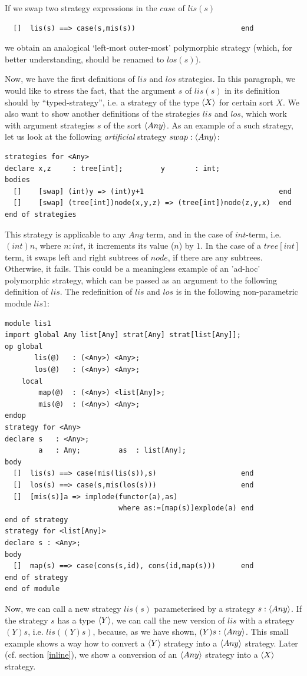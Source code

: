 \documentclass{article}
\begin{document}
{If we swap two strategy expressions in the $case$ of $lis(s)$
%
{\small
\begin{verbatim}
  []  lis(s) ==> case(s,mis(s))                         end
\end{verbatim}}\noindent
%
we obtain an analogical `left-most outer-most' polymorphic strategy
(which, for better understanding, should be renamed to $los(s)$).

Now, we have the first definitions of $lis$ and $los$ strategies.
In this paragraph, we would like to stress the fact, that
the argument $s$ of $lis(s)$ in its definition should by
``typed-strategy'', i.e. a strategy of the type $\langle X \rangle$ for certain
sort $X$. We also want to show another definitions of the strategies
$lis$ and $los$, which work with argument strategies $s$ of the sort 
$\langle Any \rangle$.
As an example of a such strategy, let us look at the following 
{\em artificial} strategy $swap : \langle Any \rangle$:
%
{\small
\begin{verbatim}
strategies for <Any>
declare x,z     : tree[int];         y       : int;
bodies
  []    [swap] (int)y => (int)y+1                                end
  []    [swap] (tree[int])node(x,y,z) => (tree[int])node(z,y,x)  end
end of strategies
\end{verbatim}} \noindent
%
This strategy is applicable to any $Any$ term, and in the case of
$int$-term, i.e. $(int)n$, where $n:int$, 
it increments its value ($n$) by $1$.
In the case of a $tree[int]$ term, 
it swaps left and right subtrees of $node$, if there are any subtrees.
Otherwise, it fails.
This could be
a meaningless example of an 'ad-hoc' polymorphic strategy, which can be
passed as an argument to the following definition of $lis$. 
The redefinition of $lis$ and $los$ is in the following 
non-parametric module $lis1$:
%
{\small
\begin{verbatim}
module lis1
import global Any list[Any] strat[Any] strat[list[Any]];
op global
       lis(@)   : (<Any>) <Any>;
       los(@)   : (<Any>) <Any>;
    local
        map(@)  : (<Any>) <list[Any]>;
        mis(@)  : (<Any>) <Any>;
endop
strategy for <Any>
declare s   : <Any>;
        a   : Any;         as  : list[Any];
body
  []  lis(s) ==> case(mis(lis(s)),s)                    end
  []  los(s) ==> case(s,mis(los(s)))                    end
  []  [mis(s)]a => implode(functor(a),as) 
                           where as:=[map(s)]explode(a) end
end of strategy
strategy for <list[Any]>
declare s : <Any>;
body
  []  map(s) ==> case(cons(s,id), cons(id,map(s)))      end
end of strategy
end of module
\end{verbatim}}\noindent
%
Now, we can call a new strategy $lis(s)$ parameterised by a strategy 
$s:\langle Any \rangle$.
If the strategy $s$ has a type $\langle Y \rangle$, we can call
the new version of $lis$ with a strategy $(Y)s$, i.e. $lis((Y)s)$,
because, as we have shown, $(Y)s : \langle Any \rangle$.
This small example shows a way how to convert a $\langle Y \rangle$ strategy into 
a $\langle Any \rangle$ strategy.
Later (cf. section \ref{inline}), 
we show a conversion of an $\langle Any \rangle$ strategy into a $\langle X \rangle$ strategy.
}
\end{document}

